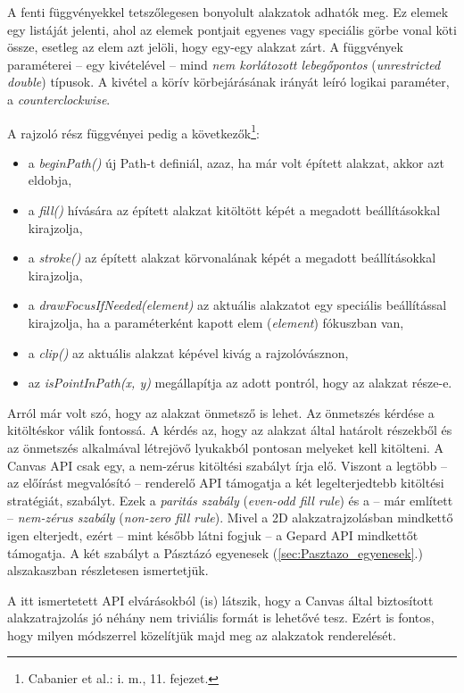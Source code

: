 \documentclass[12pt]{report}
\theoremstyle{definition}
\newcommand{\inenglish}[1]{\textsl{#1}}
\newcommand{\func}[1]{{\textsl{#1}}}
\begin{document}
A fenti függvényekkel tetszőlegesen bonyolult alakzatok adhatók meg. Ez elemek
egy listáját jelenti, ahol az elemek pontjait egyenes vagy speciális görbe
vonal köti össze, esetleg az elem azt jelöli, hogy egy-egy alakzat zárt. A
függvények paraméterei -- egy kivételével -- mind \emph{nem korlátozott
lebegőpontos} (\func{unrestricted double}) típusok. A kivétel a körív
körbejárásának irányát leíró logikai paraméter, a \func{counterclockwise}.

A rajzoló rész függvényei pedig a következők\footnote{Cabanier et al.: i.
m., 11. fejezet.}:
\begin{itemize}
  \item a \func{beginPath()} új Path-t definiál, azaz, ha már volt épített
  alakzat, akkor azt eldobja,
  \item a \func{fill()} hívására az épített alakzat kitöltött képét a megadott
  beállításokkal kirajzolja,
  \item a \func{stroke()} az épített alakzat körvonalának képét a megadott
  beállításokkal kirajzolja,
  \item a \func{drawFocusIfNeeded(element)} az aktuális alakzatot egy speciális
  beállítással kirajzolja, ha a paraméterként kapott elem (\func{element})
  fókuszban van,
  \item a \func{clip()} az aktuális alakzat képével kivág a rajzolóvásznon,
  \item az \func{isPointInPath(x, y)} megállapítja az adott pontról, hogy az
  alakzat része-e.
\end{itemize}

Arról már volt szó, hogy az alakzat önmetsző is lehet. Az önmetszés kérdése a
kitöltéskor válik fontossá. A kérdés az, hogy az alakzat által határolt
részekből és az önmetszés alkalmával létrejövő lyukakból pontosan melyeket kell
kitölteni. A Canvas API csak egy, a nem-zérus kitöltési szabályt írja elő.
Viszont a legtöbb -- az előírást megvalósító -- renderelő API támogatja a két
legelterjedtebb kitöltési stratégiát, szabályt. Ezek a \emph{paritás szabály}
(\inenglish{even-odd fill rule}) és a -- már említett -- \emph{nem-zérus szabály}
(\inenglish{non-zero fill rule}). Mivel a 2D alakzatrajzolásban mindkettő igen
elterjedt, ezért -- mint később látni fogjuk -- a Gepard API mindkettőt
támogatja. A két szabályt a Pásztázó egyenesek (\ref{sec:Pasztazo_egyenesek}.)
alszakaszban részletesen ismertetjük.

A itt ismertetett API elvárásokból (is) látszik, hogy a Canvas által
biztosított alakzatrajzolás jó néhány nem triviális formát is lehetővé tesz.
Ezért is fontos, hogy milyen módszerrel közelítjük majd meg az alakzatok
renderelését.
\end{document}
